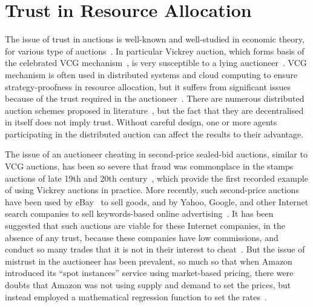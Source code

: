 
\section{Trust in Resource Allocation}
\label{sec__related_work_trust}


The issue of trust in auctions is well-known and well-studied in economic theory,
for various type of auctions~\cite{Sandholm2000}.
In particular Vickrey auction, 
which forms basis of the celebrated VCG mechanism~\cite{Nisan2001}, 
is very susceptible to a lying auctioneer~\cite{Sandholm2000}.
VCG mechanism is often used in distributed systems and cloud computing
to ensure strategy-proofness in resource allocation, 
but it suffers from significant issues because of the trust 
required in the auctioneer~\cite{Sandholm2000}.
There are numerous distributed auction schemes 
proposed in literature~\cite{Guo2013, Zhou2008, Lai2004},
but the fact that they are decentralised in itself does not imply trust.
Without careful design, one or more agents participating in the
distributed auction can affect the results to their advantage.

The issue of an auctioneer cheating in second-price sealed-bid auctions, similar to VCG auctions,
has been so severe that fraud was commonplace in the stamps auctions 
of late 19th and 20th century~\cite{Lucking-Reiley2000},
which provide the first recorded example of using Vickrey auctions in practice.
More recently, such second-price auctions have been used by eBay~\cite{Lucking-Reiley2000Auctions} to sell goods, 
and by Yahoo, Google, and other Internet search companies to sell keywords-based 
online advertising~\cite{Edelman2007}.
It has been suggested that such auctions are viable for these Internet companies,
in the absence of any trust, because these companies have low commissions,
and conduct so many trades that it is not in their interest to cheat~\cite{Lucking-Reiley2000}.
But the issue of mistrust in the auctioneer has been prevalent, 
so much so that when Amazon introduced its
\enquote{spot instances} service using market-based pricing, 
there were doubts that Amazon was not using supply and demand to set the prices,
but instead employed a mathematical regression function to set the rates~\cite{BenYehuda2013}.

